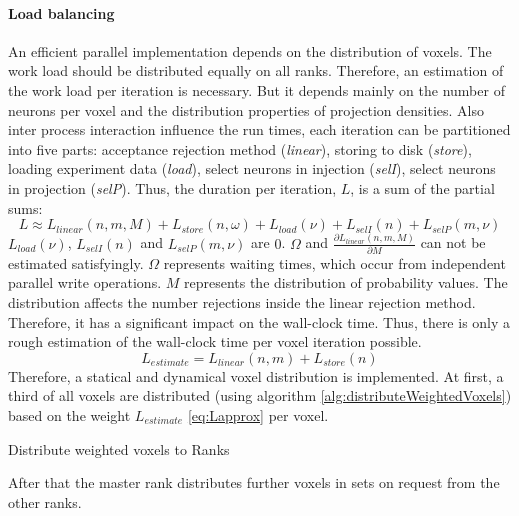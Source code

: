 \paragraph{Load balancing}
\label{par:loadbalancing}
An efficient parallel implementation depends on the distribution of voxels.
The work load should be distributed equally on all ranks.
Therefore, an estimation of the work load per iteration is necessary.
But it depends mainly on the number of neurons per voxel and the distribution properties of projection densities.
Also inter process interaction influence the run times,
each iteration can be partitioned into five parts: acceptance rejection method (\emph{linear}), storing to disk (\emph{store}),
loading experiment data (\emph{load}), select neurons in injection (\emph{selI}), select neurons in projection (\emph{selP}).
Thus, the duration per iteration, $L$, is a sum of the partial sums:
\begin{equation} \label{eq:L}
	L \approx L_{linear}(n,m,M) + L_{store}(n,\omega) + L_{load}(\nu) + L_{selI}(n) + L_{selP}(m,\nu)
\end{equation}
$L_{load}(\nu)$, $L_{selI}(n)$ and $L_{selP}(m,\nu)$ are $0$.
$\Omega$ and $\frac{\partial L_{linear}(n,m,M)}{\partial M}$  can not be estimated satisfyingly.
$\Omega$ represents waiting times, which occur from independent parallel write operations.
$M$ represents the distribution of probability values.
The distribution affects the number rejections inside the linear rejection method.
Therefore, it has a significant impact on the wall-clock time.
Thus, there is only a rough estimation of the wall-clock time per voxel iteration possible.
\begin{equation} \label{eq:Lapprox}
	L_{estimate} = L_{linear}(n,m) + L_{store}(n)
\end{equation}
Therefore, a statical and dynamical voxel distribution is implemented.
At first, a third of all voxels are distributed (using algorithm \ref{alg:distributeWeightedVoxels}) based on the weight $L_{estimate}$ \ref{eq:Lapprox}  per voxel.
\begin{algorithm}[ht!]
\caption{Distribute weighted voxels to Ranks}
\label{alg:distributeWeightedVoxels}
\end{algorithm}
After that the master rank distributes further voxels in sets on request from the other ranks.

